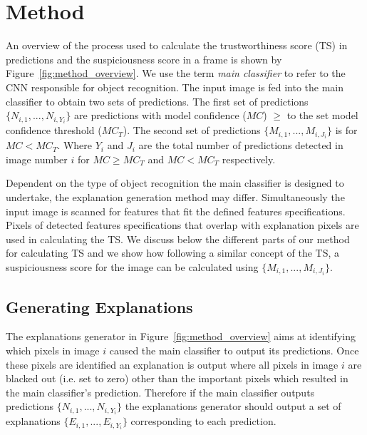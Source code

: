 \section{Method} \label{sec:method}

An overview of the process used to calculate the trustworthiness score (TS) in predictions and the suspiciousness score in a frame is shown by 
Figure~\ref{fig:method_overview}. 
%
We use the term \textit{main classifier} to refer to the CNN responsible for object recognition. 
%
The input image is fed into the main classifier to obtain two sets of predictions. The first set of predictions $\{N_{i,1},..., N_{i,Y_i}\}$ are predictions with model confidence ($MC$) $\geq$ to the set model confidence threshold ($MC_T$). 
%
The second set of predictions $\{M_{i,1},..., M_{i,J_i}\}$ is for $MC < MC_T$. Where $Y_i$ and $J_i$ are the total number of predictions detected in image number $i$ for $MC \geq MC_T$ and $MC<MC_T$ respectively. 

Dependent on the type of object recognition the main classifier is designed to undertake, the explanation generation method may differ.
%
%
Simultaneously the input image is scanned for features that fit the defined features specifications. Pixels of detected features specifications that overlap with explanation pixels are used in calculating the TS.
%
We discuss below the different parts of our method for calculating TS and we show how following a similar concept of the TS, a suspiciousness score for the image can be calculated using $\{M_{i,1},..., M_{i,J_i}\}$.


\subsection{Generating Explanations}
The explanations generator in Figure~\ref{fig:method_overview}
aims at identifying which pixels in image $i$ caused the main classifier to output its predictions. Once these pixels are identified an explanation is output where all pixels in image $i$ are blacked out (i.e. set to zero) other than the important pixels which resulted in the main classifier's prediction. Therefore if the main classifier outputs predictions $\{N_{i,1},..., N_{i,Y_i}\}$ the explanations generator should output a set of explanations $\{E_{i,1},..., E_{i,Y_i}\}$ corresponding to each prediction.  

